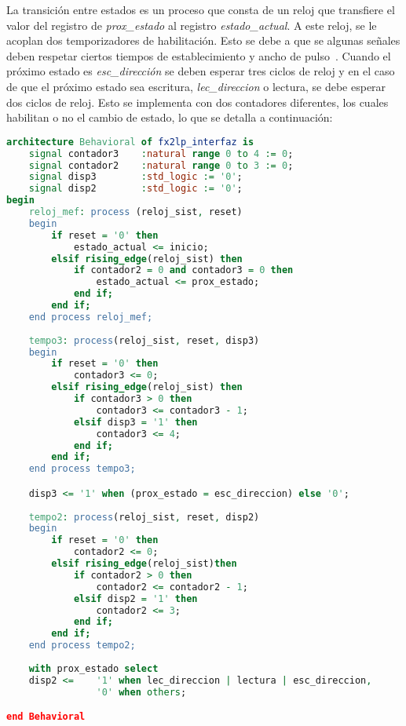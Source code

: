La transición entre estados es un proceso que consta de un reloj que  transfiere el valor del registro de \textit{prox\_estado} al registro \textit{estado\_actual}. A este reloj, se le acoplan dos temporizadores de habilitación. Esto se debe a que se algunas señales deben respetar ciertos tiempos de establecimiento y ancho de pulso~\cite{Cypress2017}. Cuando el próximo estado es \textit{esc\_dirección} se deben esperar tres ciclos de reloj y en el caso de que el próximo estado sea escritura, \textit{lec\_direccion} o lectura, se debe esperar dos ciclos de reloj.
Esto se implementa con dos contadores diferentes, los cuales habilitan o no el cambio de estado, lo que se detalla a continuación:

\begin{lstlisting}[language=VHDL,backgroundcolor=\color{gray!30}]
architecture Behavioral of fx2lp_interfaz is
	signal contador3	:natural range 0 to 4 := 0;
	signal contador2	:natural range 0 to 3 := 0;
	signal disp3		:std_logic := '0';
	signal disp2		:std_logic := '0';
begin
	reloj_mef: process (reloj_sist, reset)
	begin
		if reset = '0' then
			estado_actual <= inicio;
		elsif rising_edge(reloj_sist) then
			if contador2 = 0 and contador3 = 0 then
				estado_actual <= prox_estado;
			end if;
		end if;
	end process reloj_mef;
	
	tempo3: process(reloj_sist, reset, disp3)
	begin
		if reset = '0' then
			contador3 <= 0;
		elsif rising_edge(reloj_sist) then
			if contador3 > 0 then
				contador3 <= contador3 - 1;
			elsif disp3 = '1' then
				contador3 <= 4;
			end if;
		end if;
	end process tempo3;

	disp3 <= '1' when (prox_estado = esc_direccion) else '0';
	
	tempo2: process(reloj_sist, reset, disp2)
	begin
		if reset = '0' then
			contador2 <= 0;
		elsif rising_edge(reloj_sist)then
			if contador2 > 0 then
				contador2 <= contador2 - 1;
			elsif disp2 = '1' then
				contador2 <= 3;
			end if;
		end if;
	end process tempo2;
	
	with prox_estado select
	disp2 <=	'1' when lec_direccion | lectura | esc_direccion,
				'0' when others;

end Behavioral
\end{lstlisting}